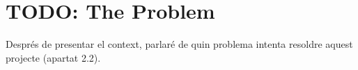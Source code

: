 
\section{TODO: The Problem}

Després de presentar el context, parlaré de quin problema intenta resoldre
aquest projecte (apartat 2.2).
